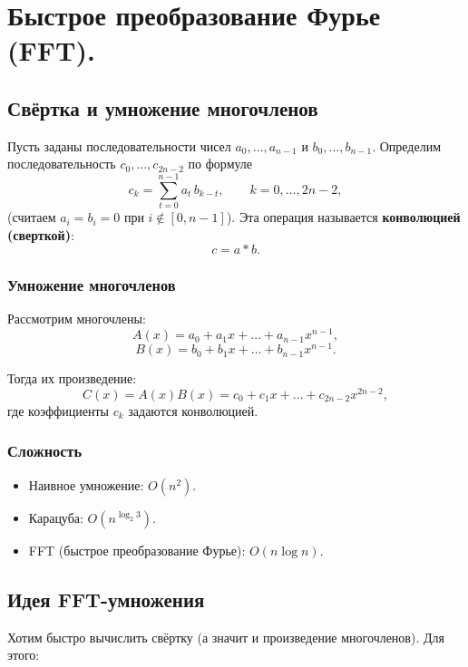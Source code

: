 
\section{Быстрое преобразование Фурье (FFT).}

\subsection*{Свёртка и умножение многочленов}

\begin{Definition}{}{}
	Пусть заданы последовательности чисел
	$a_0,\dots,a_{n-1}$ и $b_0,\dots,b_{n-1}$.
	Определим последовательность $c_0,\dots,c_{2n-2}$ по формуле
	\[
	c_k=\sum_{t=0}^{n-1} a_t\, b_{k-t}, \qquad k=0,\dots,2n-2,
	\]
	(считаем $a_i=b_i=0$ при $i\notin[0,n-1]$).
	Эта операция называется \textbf{конволюцией (сверткой)}:
	\[
	c=a*b.
	\]
\end{Definition}

\subsubsection*{Умножение многочленов}

	Рассмотрим многочлены:
	\[
	A(x)=a_0+a_1x+\dots+a_{n-1}x^{n-1},
	\]
	\[
	B(x)=b_0+b_1x+\dots+b_{n-1}x^{n-1}.
	\]
	
	Тогда их произведение:
	\[
	C(x)=A(x)B(x)
	= c_0+c_1x+\dots+c_{2n-2}x^{2n-2},
	\]
	где коэффициенты $c_k$ задаются конволюцией.

\subsubsection*{Сложность}

\begin{itemize}
	\item Наивное умножение: $O(n^2)$.
	\item Карацуба: $O\!\left(n^{\log_2 3}\right)$.
	\item FFT (быстрое преобразование Фурье): $O(n\log n)$.
\end{itemize}

\subsection*{Идея FFT-умножения}

Хотим быстро вычислить свёртку (а значит и произведение многочленов).
Для этого:

